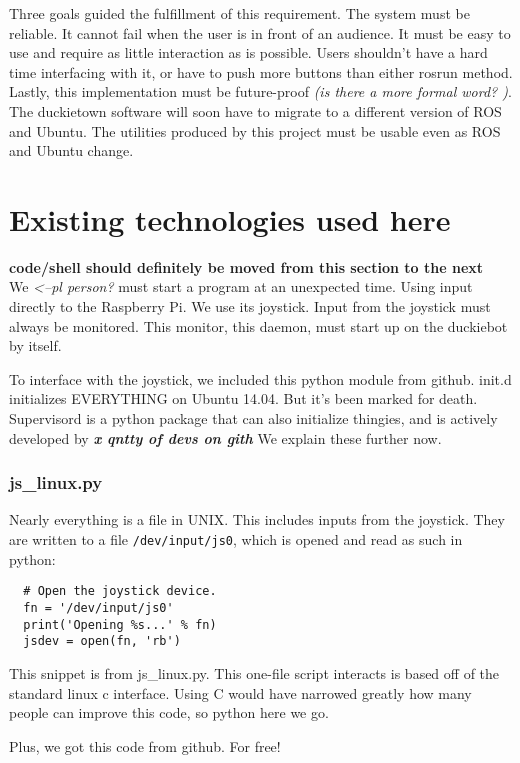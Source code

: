 \documentclass[titlepage]{article}
\begin{document}
Three goals guided the fulfillment of this requirement. The system must be reliable. It cannot fail when the user is in front of an audience. It must be easy to use and require as little interaction as is possible. Users shouldn't have a hard time interfacing with it, or have to push more buttons than either rosrun method. Lastly, this implementation must be future-proof \textit{(is there a more formal word? )}. The duckietown software will soon have to migrate to a different version of ROS and Ubuntu. The utilities produced by this project must be usable even as ROS and Ubuntu change. 
\section{Existing technologies used here} 
\textbf{code/shell should definitely be moved from this section to the next} \\
We \textit{<--pl person?} must start a program at an unexpected time. Using input directly to the Raspberry Pi. We use its joystick. Input from the joystick must always be monitored. This monitor, this daemon, must start up on the duckiebot by itself. 

To interface with the joystick, we included this python module from github. 
init.d initializes EVERYTHING on Ubuntu 14.04. But it's been marked for death.
Supervisord is a python package that can also initialize thingies, and is actively developed by \textbf{\textit{x qntty of devs on gith}}
We explain these further now. 
\subsubsection{js\_linux.py}
Nearly everything is a file in UNIX. This includes inputs from the joystick. They are written to a file \texttt{/dev/input/js0}, which is opened and read as such in python:


\begin{lstlisting}
  # Open the joystick device.
  fn = '/dev/input/js0'
  print('Opening %s...' % fn)
  jsdev = open(fn, 'rb')
\end{lstlisting}

This snippet is from js\_linux.py. This one-file script interacts is based off of the standard linux c interface. Using C would have narrowed greatly how many people can improve this code, so python here we go. 

Plus, we got this code from github. For free!
\end{document}
